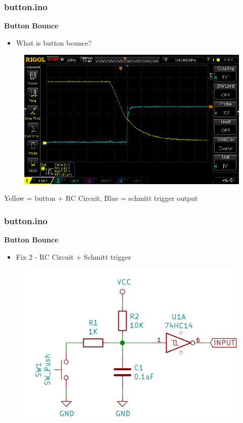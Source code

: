 \documentclass[t]{beamer}
\begin{document}

\begin{frame}[t]
\frametitle{button.ino}
\textbf{Button Bounce}
\begin{itemize}
	\item What is button bounce?
\end{itemize}
\begin{figure}
	\includegraphics[scale=0.3]{bounceRCschmitt.png}
\end{figure}
\centering
Yellow = button + RC Circuit, Blue = schmitt trigger output

\end{frame}


\begin{frame}[t]
\frametitle{button.ino}
\textbf{Button Bounce}
\begin{itemize}
	\item Fix 2 - RC Circuit + Schmitt trigger
\end{itemize}
\begin{figure}
	\includegraphics[scale=0.3]{schmittSwitch.PNG}
\end{figure}
\end{frame}
\end{document}
